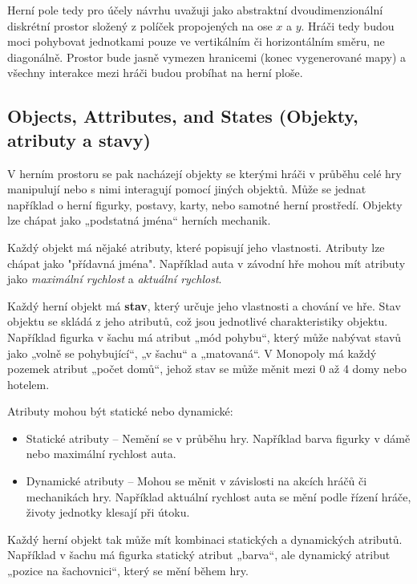 Herní pole tedy pro účely návrhu uvažuji jako abstraktní dvoudimenzionální diskrétní prostor složený z políček propojených na ose $x$ a $y$. Hráči tedy budou moci pohybovat jednotkami pouze ve vertikálním či horizontálním směru, ne diagonálně. Prostor bude jasně vymezen hranicemi (konec vygenerované mapy) a všechny interakce mezi hráči budou probíhat na herní ploše. 

\subsection{Objects, Attributes, and States (Objekty, atributy a stavy)}


V herním prostoru se pak nacházejí objekty se kterými hráči v průběhu celé hry manipulují nebo s nimi interagují pomocí jiných objektů. Může se jednat například o herní figurky, postavy, karty, nebo samotné herní prostředí. Objekty lze chápat jako „podstatná jména“ herních mechanik. 

Každý objekt má nějaké atributy, které popisují jeho vlastnosti. Atributy lze chápat jako "přídavná jména". Například auta v závodní hře mohou mít atributy jako \textit{maximální rychlost} a \textit{aktuální rychlost}. 

Každý herní objekt má \textbf{stav}, který určuje jeho vlastnosti a chování ve hře. Stav objektu se skládá z jeho atributů, což jsou jednotlivé charakteristiky objektu. Například figurka v šachu má atribut „mód pohybu“, který může nabývat stavů jako „volně se pohybující“, „v šachu“ a „matovaná“. V Monopoly má každý pozemek atribut „počet domů“, jehož stav se může měnit mezi 0 až 4 domy nebo hotelem.

Atributy mohou být statické nebo dynamické:

\begin{itemize} \item Statické atributy – Nemění se v průběhu hry. Například barva figurky v dámě nebo maximální rychlost auta.
\item Dynamické atributy – Mohou se měnit v závislosti na akcích hráčů či mechanikách hry. Například aktuální rychlost auta se mění podle řízení hráče, životy jednotky klesají při útoku. \end{itemize}

Každý herní objekt tak může mít kombinaci statických a dynamických atributů. Například v šachu má figurka statický atribut „barva“, ale dynamický atribut „pozice na šachovnici“, který se mění během hry.

